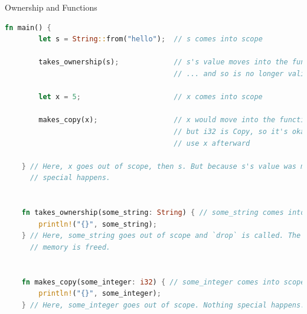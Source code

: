 \begin{Frame}{Ownership and Functions}
  \begin{lstlisting}[language=Rust,gobble=4]
    fn main() {
        let s = String::from("hello");  // s comes into scope

        takes_ownership(s);             // s's value moves into the function...
                                        // ... and so is no longer valid here

        let x = 5;                      // x comes into scope

        makes_copy(x);                  // x would move into the function,
                                        // but i32 is Copy, so it's okay to still
                                        // use x afterward

    } // Here, x goes out of scope, then s. But because s's value was moved, nothing
      // special happens.


    fn takes_ownership(some_string: String) { // some_string comes into scope
        println!("{}", some_string);
    } // Here, some_string goes out of scope and `drop` is called. The backing
      // memory is freed.


    fn makes_copy(some_integer: i32) { // some_integer comes into scope
        println!("{}", some_integer);
    } // Here, some_integer goes out of scope. Nothing special happens.
  \end{lstlisting}
\end{Frame}


